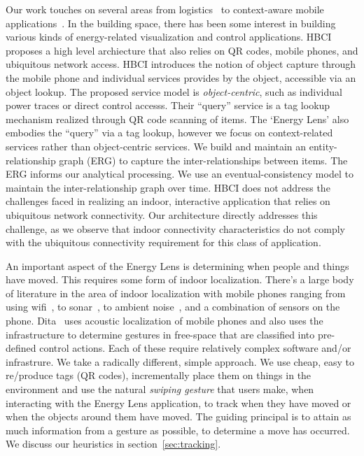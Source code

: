 Our work touches on several areas from logistics~\cite{rfid_gonz2006} 
to context-aware 
mobile applications~\cite{ACE}.  
In the building space, there has been
some interest in building various kinds of energy-related visualization and control applications.
HBCI~\cite{hbci} proposes a high level archiecture that also relies on QR codes, mobile phones, and ubiquitous network access.  HBCI introduces 
the notion of object capture through 
the mobile phone and  individual services provides by the object, accessible via an object lookup.  The proposed service model is 
\emph{object-centric}, such as individual power traces or direct control accesss.  Their ``query'' service is a tag lookup mechanism realized through
 QR code scanning of items.  The `Energy Lens' also embodies the ``query'' via a tag lookup, however 
we focus on context-related services rather than object-centric services.  We build and maintain an entity-relationship graph (ERG) to
capture the inter-relationships between items.  The ERG informs our analytical processing.  We use an eventual-consistency model to 
maintain the inter-relationship graph over time.  HBCI does not address the challenges faced in realizing an indoor, interactive application 
that relies on ubiquitous network connectivity.  Our architecture directly addresses this challenge, as we observe that indoor connectivity characteristics do 
not comply with the ubiquitous connectivity requirement for this class of application.


An important aspect of the Energy Lens is determining when people and things have moved.  This requires some form 
of indoor localization.  There's a large body of literature in the area of indoor localization with mobile phones ranging from 
using wifi~\cite{radar}, to sonar~\cite{cricket}, to ambient noise~\cite{abs}, and a combination of sensors on the 
phone\cite{surroundsense}.  Dita~\cite{dita} uses acoustic localization of mobile phones and also uses the infrastructure 
to determine gestures in free-space that are classified into pre-defined control actions.  Each of these require relatively complex 
software and/or infrastrure.  
We take a radically different, simple approach.  We use cheap, easy to re/produce tags (QR codes), incrementally place them on things in the 
environment and use the natural \emph{swiping gesture} that users make, when interacting with the Energy Lens 
application, to track when they have moved or when the objects around them have moved.  The guiding principal is to attain as much 
information from a gesture as possible, to determine a move has occurred.  We discuss our heuristics in section~\ref{sec:tracking}.

